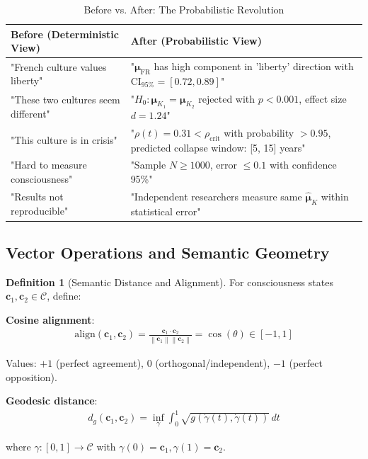 \documentclass[11pt,a4paper]{article}
\theoremstyle{definition}
\newtheorem{definition}{Definition}[section]
\theoremstyle{remark}
\newcommand{\CC}{\mathcal{C}}
\newcommand{\cc}{\mathbf{c}}
\newcommand{\norm}[1]{\left\|#1\right\|}
\begin{document}
\begin{small}
\begin{table}[H]
\centering
\caption{Before vs. After: The Probabilistic Revolution}
\label{tab:before_after_probability}
\begin{tabular}{|p{6cm}|p{7cm}|}
\hline
\textbf{Before (Deterministic View)} & \textbf{After (Probabilistic View)} \\
\hline
"French culture values liberty" & "\(\boldsymbol{\mu}_{\text{FR}}\) has high component in 'liberty' direction with \(\text{CI}_{95\%} = [0.72, 0.89]\)" \\
\hline
"These two cultures seem different" & "\(H_0: \boldsymbol{\mu}_{K_1} = \boldsymbol{\mu}_{K_2}\) rejected with \(p < 0.001\), effect size \(d=1.24\)" \\
\hline
"This culture is in crisis" & "\(\rho(t) = 0.31 < \rho_{\text{crit}}\) with probability \(>0.95\), predicted collapse window: [5, 15] years" \\
\hline
"Hard to measure consciousness" & "Sample \(N \geq 1000\), error \(\leq 0.1\) with confidence 95\%" \\
\hline
"Results not reproducible" & "Independent researchers measure same \(\hat{\boldsymbol{\mu}}_K\) within statistical error" \\
\hline
\end{tabular}
\end{table}

\subsection{Vector Operations and Semantic Geometry}

\begin{definition}[Semantic Distance and Alignment]
For consciousness states \(\cc_1, \cc_2 \in \CC\), define:

\textbf{Cosine alignment}:
\begin{align}
\text{align}(\cc_1, \cc_2) = \frac{\cc_1 \cdot \cc_2}{\norm{\cc_1} \norm{\cc_2}} = \cos(\theta) \in [-1, 1]
\end{align}

Values: \(+1\) (perfect agreement), \(0\) (orthogonal/independent), \(-1\) (perfect opposition).

\textbf{Geodesic distance}:
\begin{align}
d_g(\cc_1, \cc_2) = \inf_{\gamma} \int_0^1 \sqrt{g(\dot{\gamma}(t), \dot{\gamma}(t))} \, dt
\end{align}

where \(\gamma: [0,1] \to \CC\) with \(\gamma(0) = \cc_1, \gamma(1) = \cc_2\).
\end{definition}


\end{small}
\end{document}
